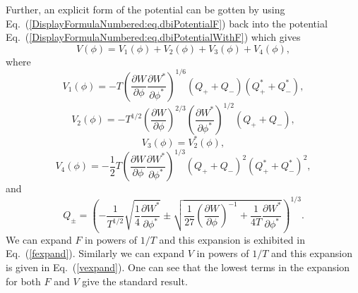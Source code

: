 \documentclass[a4paper,11pt]{article}
\begin{document}
	Further, an explicit form of the potential can be gotten by using
	Eq.~(\ref{DisplayFormulaNumbered:eq.dbiPotentialF}) back into the potential Eq.~(\ref{DisplayFormulaNumbered:eq.dbiPotentialWithF}) which gives
  \begin{equation}\label{DisplayFormulaNumbered:eq.dbiPotential}
    V\left(\phi \right) = V_1\left(\phi \right) + V_2\left(\phi \right) + V_3\left(\phi \right) + V_4\left(\phi \right),
  \end{equation}
  where
	\begin{equation}\label{DisplayFormulaNumbered:eq.dbiPotential}
		V_1\left(\phi \right)
		=-T {\left(\frac{\partial W}{\partial \phi}\frac{\partial W^*}{\partial \phi^*}\right)}^{1/6}\left(Q_{+}+Q_{-}\right)\left(Q_{+}^*+Q_{-}^*\right),
  \end{equation}
  \begin{equation}
    V_2\left(\phi \right)
		=-T^{1/2}{\left(\frac{\partial W}{\partial \phi}\right)}^{2/3}{\left(\frac{\partial W^*}{\partial \phi^*}\right)}^{1/2}\left(Q_+ + Q_-\right),
  \end{equation}
  \begin{equation}
		V_3\left(\phi \right) = V_2^* \left(\phi \right),
  \end{equation}
  \begin{equation}
		V_4\left(\phi \right)
    =-\frac{1}{2}T {\left(\frac{\partial W}{\partial \phi}\frac{\partial W^*}{\partial \phi^*}\right)}^{1/3}\left(Q_+ + Q_-\right)^2 \left(Q_+^* + Q_-^*\right)^2,
	\end{equation}
  and
  \begin{equation}
    Q_\pm = \left(-\frac{1}{T^{1/2}}\sqrt{\frac{1}{4}\frac{\partial W^*}{\partial \phi^*}}\pm\sqrt{\frac{1}{27}{\left(\frac{\partial W}{\partial \phi}\right)}^{-1}+\frac{1}{4T}\frac{\partial W^*}{\partial \phi^*}}\right)^{1/3}.
  \end{equation}
	We can expand $F$ in powers of $1/T$ and this expansion is exhibited in Eq.~(\ref{fexpand}). Similarly we can expand $V$ in powers of $1/T$ and this
	expansion is given in Eq.~(\ref{vexpand}).
	One can see that the lowest terms in the expansion for both $F$ and $V$ give the standard result.

\end{document}
